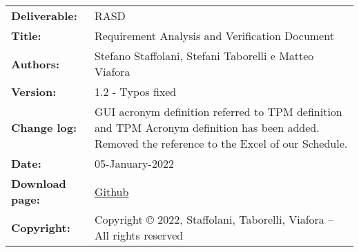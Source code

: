 \begin{table}[h!]
\begin{tabu} to \textwidth { X[0.3,r,p] X[0.7,l,p] }
\hline

\textbf{Deliverable:} & RASD\\
\textbf{Title:} & Requirement Analysis and Verification Document \\
\textbf{Authors:} & Stefano Staffolani, Stefani Taborelli e Matteo Viafora \\
\textbf{Version:} & 1.2 - Typos fixed \\
\textbf{Change log:} & GUI acronym definition referred to TPM definition and TPM Acronym definition has been added. Removed the reference to the Excel of our Schedule.\\
\textbf{Date:} & 05-January-2022 \\
\textbf{Download page:} & \href{https://github.com/ViaforaMatteo/StaffolaniTaborelliViafora}{Github} \\
\textbf{Copyright:} & Copyright © 2022, Staffolani, Taborelli, Viafora – All rights reserved \\
\hline
\end{tabu}
\end{table}